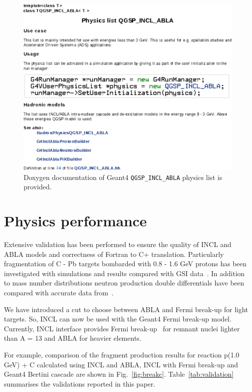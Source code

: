 \documentclass[a4paper]{jpconf}
\begin{document}
\begin{figure}[h]
\begin{center}
\includegraphics[scale=0.70]{poster/images/inclAblaDoc.eps}
\caption{Doxygen documentation of Geant4 {\tt QGSP\_\-INCL\_ABLA} physics list is provided.}
\end{center}
\label{fig:doxygen}
\end{figure}

\section{Physics performance}\label{sec:performance}
Extensive validation has been performed to ensure the quality of INCL and ABLA models and correctness
of Fortran to C+ translation. 
Particularly fragmentation of C - Pb targets bombarded with 0.8 - 1.6 GeV protons has been investigated
with simulations and results compared with GSI data~\cite{gsifragments}.
In addition to mass number distributions neutron production double differentials
have been compared with accurate data from~\cite{data}.


We have introduced a cut to choose between ABLA and Fermi break-up for light targets.
So, INCL can now be used with the Geant4 Fermi break-up model.
Currently, INCL interface provides Fermi break-up~\cite{g4incl} for
remnant nuclei lighter than A = 13 and ABLA for heavier elements.


For example, comparison of the fragment production results for reaction p(1.0 GeV) + C 
calculated using INCL and ABLA, INCL with Fermi break-up and
Geant4 Bertini cascade are shown in Fig.~\ref{fig:breakc}.
Table~\ref{tab:validation} summarises the validations reported in this paper.
\end{document}
